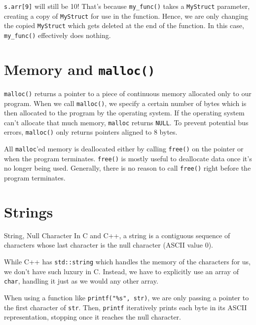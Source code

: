 \documentclass[12pt]{report}
\begin{document}
\texttt{s.arr[9]} will still be 10! That's because \texttt{my\_func()} takes a \texttt{MyStruct} parameter, creating a copy of \texttt{MyStruct} for use in the function. Hence, we are only changing the copied \texttt{MyStruct} which gets deleted at the end of the function.
In this case, \texttt{my\_func()} effectively does nothing.

\section{Memory and \texttt{malloc()}}
\texttt{malloc()} returns a pointer to a piece of continuous memory allocated only to our program. When we call \texttt{malloc()}, we specify a certain number of bytes which is then allocated to the program by the operating system. If the operating system can't allocate that much memory, \texttt{malloc} returns \texttt{NULL}. To prevent potential bus errors, \texttt{malloc()} only returns pointers aligned to $8$ bytes.

All \texttt{malloc}'ed memory is deallocated either by calling \texttt{free()} on the pointer or when the program terminates. \texttt{free()} is mostly useful to deallocate data once it's no longer being used. Generally, there is no reason to call \texttt{free()} right before the program terminates.


\section{Strings}

\begin{dfnbox}{String, Null Character}{}
In C and C++, a string is a contiguous sequence of characters whose last character is the null character (ASCII value 0).
\end{dfnbox}

While C++ has \texttt{std::string} which handles the memory of the characters for us, we don't have such luxury in C. Instead, we have to explicitly use an array of \texttt{char}, handling it just as we would any other array.

When using a function like \texttt{printf("\%s", str)}, we are only passing a pointer to the first character of \texttt{str}. Then, \texttt{printf} iteratively prints each byte in its ASCII representation, stopping once it reaches the null character.
\end{document}
